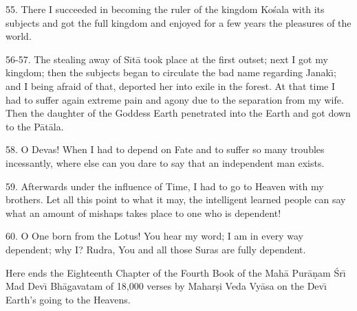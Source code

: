 55. There I succeeded in becoming the ruler of the kingdom Ko\'sala with its subjects and got the full kingdom and enjoyed for a few years the pleasures of the world.

56-57. The stealing away of S\={\i}t\=a took place at the first outset; next I got my kingdom; then the subjects began to circulate the bad name regarding Janak\={\i}; and I being afraid of that, deported her into exile in the forest. At that time I had to suffer again extreme pain and agony due to the separation from my wife. Then the daughter of the Goddess Earth penetrated into the Earth and got down to the P\=at\=ala.

58. O Devas! When I had to depend on Fate and to suffer so many troubles incessantly, where else can you dare to say that an independent man exists.

59. Afterwards under the influence of Time, I had to go to Heaven with my brothers. Let all this point to what it may, the intelligent learned people can say what an amount of mishaps takes place to one who is dependent!

60. O One born from the Lotus! You hear my word; I am in every way dependent; why I? Rudra, You and all those Suras are fully dependent.

Here ends the Eighteenth Chapter of the Fourth Book of the Mah\=a Pur\=a\d{n}am \'Sr\={\i} Mad Dev\={\i} Bh\=agavatam of 18,000 verses by Mahar\d{s}i Veda Vy\=asa on the Dev\={\i} Earth's going to the Heavens.



